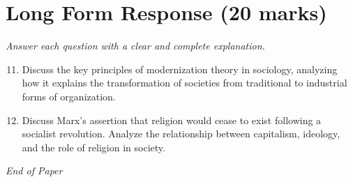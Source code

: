 \documentclass[12pt]{article}
\begin{document}
\section*{Long Form Response (20 marks)}
\textit{Answer each question with a clear and complete explanation.}
\begin{enumerate}[label=\arabic*.]
\setcounter{enumi}{10}
\item Discuss the key principles of modernization theory in sociology, analyzing how it explains the transformation of societies from traditional to industrial forms of organization.
\item Discuss Marx's assertion that religion would cease to exist following a socialist revolution. Analyze the relationship between capitalism, ideology, and the role of religion in society.
\end{enumerate}

\vfill
\noindent\textit{End of Paper}
\end{document}
